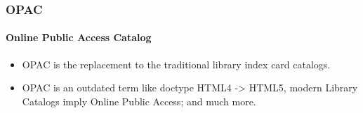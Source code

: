 
\begin{frame}
    \frametitle{OPAC}
    \framesubtitle{Online Public Access Catalog}
    \begin{itemize}
        \item OPAC is the replacement to the traditional library index card catalogs.
        \item OPAC is an outdated term like doctype HTML4 -> HTML5, modern Library Catalogs imply Online Public Access; and much more.
    \end{itemize}
\end{frame}
